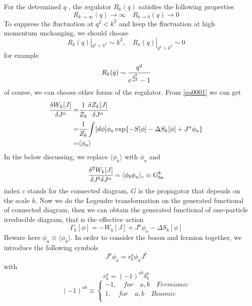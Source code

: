 \documentclass[UTF8]{article}
\begin{document}
For the determined $q$ , the regulator $R_k(q)$ satisfies the following properties
\begin{equation}
R_{k\rightarrow\infty}(q)\rightarrow\infty
\quad
R_{k\rightarrow 0}(q)\rightarrow 0
\end{equation}
To suppress the fluctuation at $q^2<k^2$ and keep the fluctuation at high momentum unchanging, we should choose
\begin{equation}
R_k(q)|_{q^2<k^2}\sim k^2,
\quad
R_k(q)|_{q^2>k^2}\sim 0
\end{equation}
for example
\begin{equation}
R_k(q)\sim\cfrac{q^2}{e^{\frac{q^2}{k^2}}-1}
\end{equation}
of course, we can choose other forms of the regulator. From \eqref{eq0001} we can get
\begin{equation}
\begin{split}
\cfrac{\delta W_k[J]}{\delta J^a}=&\cfrac{1}{Z_k}
\cfrac{\delta Z_k[J]}{\delta J^a}\\
=&\cfrac{1}{Z_k}\int [d\phi]\phi_a\exp\{-S[\phi]
-\Delta S_k[\phi]+J^a\phi_a\}\\
=&\langle\phi_a\rangle
\end{split}
\end{equation}
In the below discussing, we replace $\langle\phi_a\rangle$ with $\phi_a$ and
\begin{equation}
\cfrac{\delta^2W_k[J]}{\delta J^b\delta J^a}
=\langle \phi_b\phi_a\rangle_c\equiv G_{ba}^k
\end{equation}
index $c$ stands for the connected diagram, $G$ is the propagator that depends on the scale $k$.
 Now we do the Legendre transformation on the generated functional of connected diagram,
  then we can obtain the generated functional of one-particle irreducible diagram, that is the effective action
\begin{equation}\label{eq0003}
\Gamma_k[\phi]=-W_k[J]+J^a\phi_a-\Delta S_k[\phi]
\end{equation}
Beware here $\phi_a \equiv \langle \phi_k \rangle$. In order to consider the boson and fermion together,
 we introduce the following symbols
\begin{equation}
J^a\phi_a=r^{a}_{b}\phi_aJ^b
\end{equation}
with
\begin{equation}
r^{a}_{b}=(-1)^{ab}\delta^{a}_{b}
\end{equation}
\begin{equation}
(-1)^{ab}\equiv
\begin{cases}
-1,\quad for \quad a,b \quad Fermionic\\
1,\quad for \quad a,b \quad Bosonic\\
\end{cases}
\end{equation}
\end{document}
